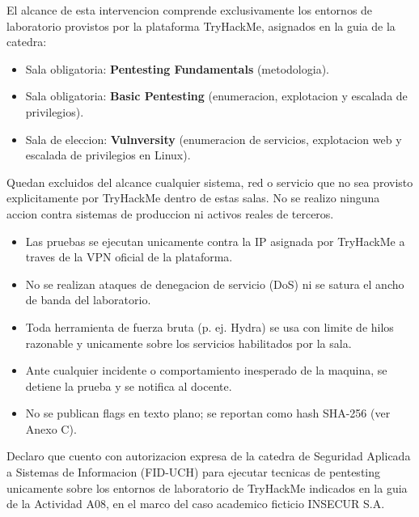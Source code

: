 \documentclass[11pt,a4paper]{article}
\begin{document}
\begin{campo}
El alcance de esta intervencion comprende exclusivamente los entornos de laboratorio provistos por la plataforma TryHackMe, asignados en la guia de la catedra:
\begin{itemize}
  \item Sala obligatoria: \textbf{Pentesting Fundamentals} (metodologia).
  \item Sala obligatoria: \textbf{Basic Pentesting} (enumeracion, explotacion y escalada de privilegios).
  \item Sala de eleccion: \textbf{Vulnversity} (enumeracion de servicios, explotacion web y escalada de privilegios en Linux).
\end{itemize}
Quedan excluidos del alcance cualquier sistema, red o servicio que no sea provisto explicitamente por TryHackMe dentro de estas salas. No se realizo ninguna accion contra sistemas de produccion ni activos reales de terceros.
\end{campo}

\begin{campo}
\begin{itemize}
  \item Las pruebas se ejecutan unicamente contra la IP asignada por TryHackMe a traves de la VPN oficial de la plataforma.
  \item No se realizan ataques de denegacion de servicio (DoS) ni se satura el ancho de banda del laboratorio.
  \item Toda herramienta de fuerza bruta (p. ej. Hydra) se usa con limite de hilos razonable y unicamente sobre los servicios habilitados por la sala.
  \item Ante cualquier incidente o comportamiento inesperado de la maquina, se detiene la prueba y se notifica al docente.
  \item No se publican flags en texto plano; se reportan como hash SHA-256 (ver Anexo C).
\end{itemize}
\end{campo}

\begin{campo}[Autorizacion]
Declaro que cuento con autorizacion expresa de la catedra de Seguridad Aplicada a Sistemas de Informacion (FID-UCH) para ejecutar tecnicas de pentesting unicamente sobre los entornos de laboratorio de TryHackMe indicados en la guia de la Actividad A08, en el marco del caso academico ficticio INSECUR S.A.
\end{campo}
\end{document}
